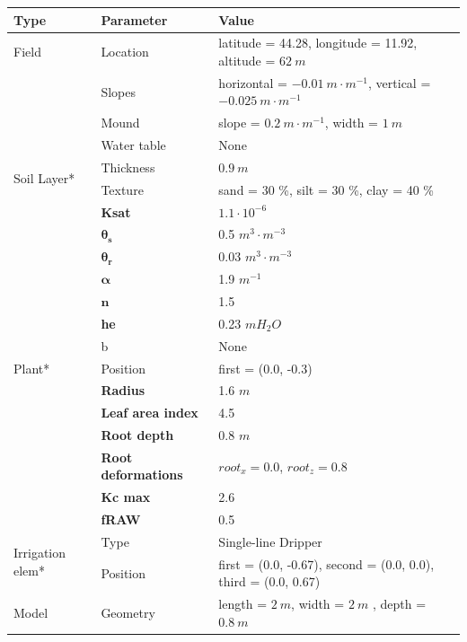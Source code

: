 \begin{table}[H]
	\centering
	\scriptsize
	\begin{tabular}{p{1.2cm}p{5cm}p{7.5cm}}
 		\textbf{Type} & \textbf{Parameter} & \textbf{Value} \\
		\hline%
		Field & Location &  latitude = 44.28, longitude = 11.92, altitude = $62~m$\\
		& Slopes & horizontal = $-0.01~m \cdot m^{-1}$, vertical = $-0.025~m \cdot 
 m^{-1}$ \\
		& Mound & slope = $0.2~m \cdot m^{-1}$, width = $1~m$ \\
		& Water table & None\\ 
		\hline%
	    \multirow{2}{1cm}{Soil Layer*}	& Thickness & $0.9~m$ \\
		& Texture & sand = 30 \%, silt = 30 \%, clay = 40 \% \\ %
		& \textbf{Ksat} & $1.1 \cdot 10^{-6}$  \\ %
		& $\pmb{\theta_s}$ & 0.5 $m^3 \cdot m^{-3}$\\  
		& $\pmb{\theta_r}$ & 0.03 $m^3 \cdot m^{-3}$\\  
		& $\pmb{\alpha}$ & 1.9 $m^{-1}$\\  
		& $\mathbf{n}$ & 1.5 \\
		& \textbf{he} & 0.23 $m H_2O$ \\ 
		& b & None \\ 
		\hline%
		Plant* & Position & first = (0.0, -0.3)\\
		& \textbf{Radius} & 1.6 $m$\\
		& \textbf{Leaf area index} & 4.5 \\ %
		& \textbf{Root depth} & 0.8 $m$ \\
		& \textbf{Root deformations} & $root_x = 0.0$, $root_z = 0.8$ \\ 
		& \textbf{Kc max} &  2.6\\
		& \textbf{fRAW} & 0.5\\
		\hline%
        \multirow{2}{1cm}{Irrigation elem*} & Type & Single-line Dripper \\
		& Position & first = (0.0, -0.67), second = (0.0, 0.0), third = (0.0, 0.67)\\
		\hline%
		Model & Geometry &  length = $2~m$, width = $2~m$ , depth = $0.8~m$ \\

\end{tabular}
\end{table}
